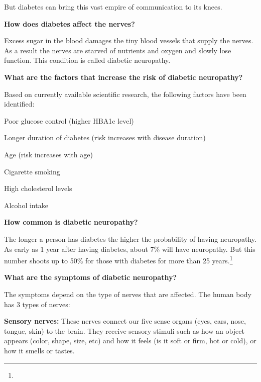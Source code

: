  But diabetes can bring this vast empire of communication to its knees.

\textbf{How does diabetes affect the nerves?}

Excess sugar in the blood damages the tiny blood vessels that supply the nerves. As a result the nerves are starved of nutrients and oxygen and slowly lose function. This condition is called diabetic neuropathy.

\textbf{What are the factors that increase the risk of diabetic neuropathy?}

Based on currently available scientific research, the following factors have been identified:

\item Poor glucose control (higher HBA1c level)

 \item Longer duration of diabetes (risk increases with disease duration)

 \item Age (risk increases with age)

 \item Cigarette smoking

 \item High cholesterol levels

 \item Alcohol intake

\textbf{How common is diabetic neuropathy?}

 The longer a person has diabetes the higher the probability of having neuropathy. As early as 1 year after having diabetes, about 7\% will have neuropathy. But this number shoots up to 50\% for those with diabetes for more than 25 years.\footnote{}

\textbf{What are the symptoms of diabetic neuropathy?}

The symptoms depend on the type of nerves that are affected. The human body has 3 types of nerves:

\item \textbf{Sensory nerves:} These nerves connect our five sense organs (eyes, ears, nose, tongue, skin) to the brain. They receive sensory stimuli such as how an object appears (color, shape, size, etc) and how it feels (is it soft or firm, hot or cold), or how it smells or tastes.

